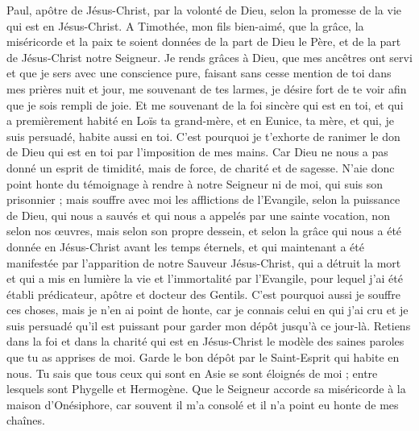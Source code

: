 \begin{multicols}{2}
\VerseOne{}Paul, apôtre de Jésus-Christ, par la volonté de Dieu, selon la promesse de la vie qui est en Jésus-Christ.
A Timothée, mon fils bien-aimé, que la grâce, la miséricorde et la paix te soient données de la part de Dieu le Père, et de la part de Jésus-Christ notre Seigneur.
Je rends grâces à Dieu, que mes ancêtres ont servi et que je sers avec une conscience pure, faisant sans cesse mention de toi dans mes prières nuit et jour,
me souvenant de tes larmes, je désire fort de te voir afin que je sois rempli de joie.
Et me souvenant de la foi sincère qui est en toi, et qui a premièrement habité en Loïs ta grand-mère, et en Eunice, ta mère, et qui, je suis persuadé, habite aussi en toi.
C'est pourquoi je t'exhorte de ranimer le don de Dieu qui est en toi par l'imposition de mes mains.
Car Dieu ne nous a pas donné un esprit de timidité, mais de force, de charité et de sagesse.
N'aie donc point honte du témoignage à rendre à notre Seigneur ni de moi, qui suis son prisonnier ; mais souffre avec moi les afflictions de l'Evangile, selon la puissance de Dieu,
qui nous a sauvés et qui nous a appelés par une sainte vocation, non selon nos œuvres, mais selon son propre dessein, et selon la grâce qui nous a été donnée en Jésus-Christ avant les temps éternels,
et qui maintenant a été manifestée par l'apparition de notre Sauveur Jésus-Christ, qui a détruit la mort et qui a mis en lumière la vie et l'immortalité par l'Evangile,
pour lequel j'ai été établi prédicateur, apôtre et docteur des Gentils.
C'est pourquoi aussi je souffre ces choses, mais je n'en ai point de honte, car je connais celui en qui j'ai cru et je suis persuadé qu'il est puissant pour garder mon dépôt jusqu'à ce jour-là.
Retiens dans la foi et dans la charité qui est en Jésus-Christ le modèle des saines paroles que tu as apprises de moi.
Garde le bon dépôt par le Saint-Esprit qui habite en nous.
Tu sais que tous ceux qui sont en Asie se sont éloignés de moi ; entre lesquels sont Phygelle et Hermogène.
Que le Seigneur accorde sa miséricorde à la maison d'Onésiphore, car souvent il m'a consolé et il n'a point eu honte de mes chaînes.

\end{multicols}
